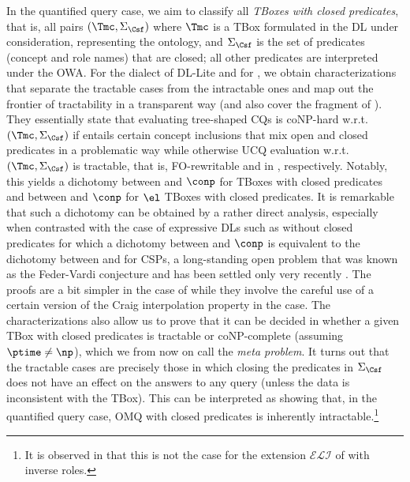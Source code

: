 \documentclass{lmcs}
\theoremstyle{definition}
\begin{document}
In the quantified query case, we aim to classify all \emph{TBoxes with
  closed predicates}, that is, all pairs $(\Tmc,\Sigma_\Csf)$ where
$\Tmc$ is a TBox formulated in the DL under consideration,
representing the ontology, and $\Sigma_\Csf$ is the set of predicates
(concept and role names) that are closed; all other predicates are
interpreted under the OWA. For the \dlliter dialect of DL-Lite and for
\EL, we obtain characterizations that separate the tractable cases
from the intractable ones and map out the frontier of tractability in
a transparent way (and also cover the fragment \dllitecore of
\dlliter). They essentially state that evaluating tree-shaped CQs is
{\sc coNP}-hard w.r.t.\ $(\Tmc,\Sigma_\Csf)$ if \Tmc entails certain
concept inclusions that mix open and closed predicates in a
problematic way while otherwise UCQ evaluation w.r.t.\
$(\Tmc,\Sigma_\Csf)$ is tractable, that is, FO-rewritable and in
\ptime, respectively.  Notably, this yields a dichotomy between
\aczero and $\conp$ for \dlliter TBoxes with closed predicates and
between \ptime and $\conp$ for $\el$ TBoxes with closed predicates.
It is remarkable that such a dichotomy can be obtained by a rather
direct analysis, especially when contrasted with the case of
expressive DLs such as \ALC without closed predicates for which a
dichotomy between \ptime and $\conp$ is equivalent to the dichotomy
between \ptime and \np for CSPs, a long-standing open problem that was
known as the Feder-Vardi conjecture and has been settled only very
recently
\cite{DBLP:journals/corr/Bulatov17a,DBLP:journals/corr/Zhuk17}.  The
proofs are a bit simpler in the case of \dlliter while they involve
the careful use of a certain version of the Craig interpolation
property in the \EL case.  The characterizations also allow us to
prove that it can be decided in \PTime whether a given TBox with
closed predicates is tractable or {\sc coNP}-complete (assuming
$\ptime \neq \np$), which we from now on call the \emph{meta
  problem}. It turns out that the tractable cases are precisely those
in which closing the predicates in $\Sigma_\Csf$ does not have an
effect on the answers to any query (unless the data is inconsistent
with the TBox).  This can be interpreted as showing that, in the
quantified query case, OMQ with closed predicates is inherently
intractable.\footnote{It is observed in
  \cite{Lutz:2013:ODA:2540128.2540276} that this is not the case for
  the extension $\mathcal{ELI}$ of \EL with inverse roles.}
\end{document}
